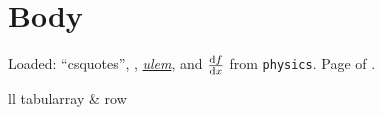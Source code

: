 \documentclass{article}
\begin{document}
\section{Body}
Loaded: \enquote{csquotes}, , \emph{\uline{ulem}}, and
$\dv{f}{x}$ from \texttt{physics}. Page \pageref{LastPage} of \pageref{LastPage}.

\begin{table}[h]
  \centering
  \begin{tblr}{ll}
    tabularray & row \\
  \end{tblr}
\end{table}

\begin{algorithm}[H]
  \caption{From algorithm2e}
\end{algorithm}
\end{document}
